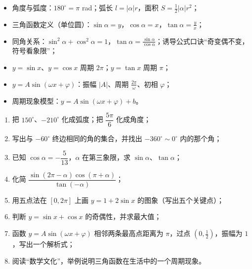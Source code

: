 \begin{board}
\begin{itemize}
  \item 角度与弧度：$180^\circ=\pi$ rad；弧长 $l=|\alpha|r$，面积 $S=\frac12|\alpha|r^2$；
  \item 三角函数定义（单位圆）：$\sin\alpha=y$，$\cos\alpha=x$，$\tan\alpha=\frac{y}{x}$；
  \item 同角关系：$\sin^2\alpha+\cos^2\alpha=1$，$\tan\alpha=\frac{\sin\alpha}{\cos\alpha}$；诱导公式口诀“奇变偶不变，符号看象限”；
  \item $y=\sin x$、$y=\cos x$ 周期 $2\pi$；$y=\tan x$ 周期 $\pi$；
  \item $y=A\sin(\omega x+\varphi)$：振幅 $|A|$、周期 $\frac{2\pi}{\omega}$、初相 $\varphi$；
  \item 周期现象模型：$y=A\sin(\omega x+\varphi)+b$。
\end{itemize}
\end{board}

\begin{homework}
\begin{enumerate}
  \item 把 $150^\circ$、$-210^\circ$ 化成弧度；把 $\dfrac{5\pi}{6}$ 化成角度；
  \item 写出与 $-60^\circ$ 终边相同的角的集合，并找出 $-360^\circ\sim0^\circ$ 内的那个角；
  \item 已知 $\cos\alpha=-\dfrac{5}{13}$，$\alpha$ 在第三象限，求 $\sin\alpha$、$\tan\alpha$；
  \item 化简 $\dfrac{\sin(2\pi-\alpha)\cos(\pi+\alpha)}{\tan(-\alpha)}$；
  \item 用五点法在 $[0,2\pi]$ 上画 $y=1+2\sin x$ 的图象（写出五个关键点）；
  \item 判断 $y=\sin x+\cos x$ 的奇偶性，并求最大值；
  \item 函数 $y=A\sin(\omega x+\varphi)$ 相邻两条最高点距离为 $\pi$，过点 $\left(0,\frac12\right)$，振幅为 $1$，写出一个解析式；
  \item 阅读“数学文化”，举例说明三角函数在生活中的一个周期现象。
\end{enumerate}
\end{homework}
